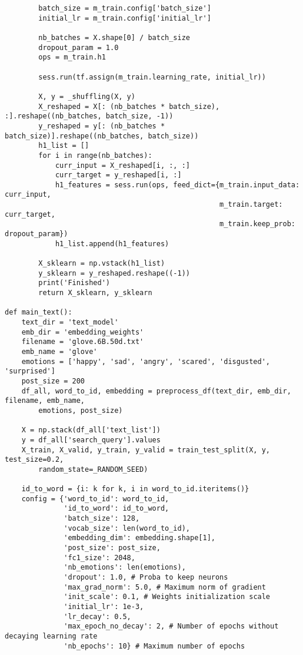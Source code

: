 \begin{lstlisting}
        batch_size = m_train.config['batch_size']
        initial_lr = m_train.config['initial_lr']
        
        nb_batches = X.shape[0] / batch_size
        dropout_param = 1.0
        ops = m_train.h1
        
        sess.run(tf.assign(m_train.learning_rate, initial_lr))

        X, y = _shuffling(X, y)
        X_reshaped = X[: (nb_batches * batch_size), :].reshape((nb_batches, batch_size, -1))
        y_reshaped = y[: (nb_batches * batch_size)].reshape((nb_batches, batch_size))
        h1_list = []
        for i in range(nb_batches):
            curr_input = X_reshaped[i, :, :]
            curr_target = y_reshaped[i, :]
            h1_features = sess.run(ops, feed_dict={m_train.input_data: curr_input, 
                                                   m_train.target: curr_target,
                                                   m_train.keep_prob: dropout_param})
            h1_list.append(h1_features)

        X_sklearn = np.vstack(h1_list)
        y_sklearn = y_reshaped.reshape((-1))
        print('Finished')
        return X_sklearn, y_sklearn

def main_text():
    text_dir = 'text_model'
    emb_dir = 'embedding_weights'
    filename = 'glove.6B.50d.txt'
    emb_name = 'glove'
    emotions = ['happy', 'sad', 'angry', 'scared', 'disgusted', 'surprised']
    post_size = 200
    df_all, word_to_id, embedding = preprocess_df(text_dir, emb_dir, filename, emb_name, 
        emotions, post_size)

    X = np.stack(df_all['text_list'])
    y = df_all['search_query'].values
    X_train, X_valid, y_train, y_valid = train_test_split(X, y, test_size=0.2, 
        random_state=_RANDOM_SEED)

    id_to_word = {i: k for k, i in word_to_id.iteritems()}
    config = {'word_to_id': word_to_id,
              'id_to_word': id_to_word,
              'batch_size': 128,
              'vocab_size': len(word_to_id),
              'embedding_dim': embedding.shape[1],
              'post_size': post_size,
              'fc1_size': 2048,
              'nb_emotions': len(emotions),
              'dropout': 1.0, # Proba to keep neurons
              'max_grad_norm': 5.0, # Maximum norm of gradient
              'init_scale': 0.1, # Weights initialization scale
              'initial_lr': 1e-3,
              'lr_decay': 0.5,
              'max_epoch_no_decay': 2, # Number of epochs without decaying learning rate
              'nb_epochs': 10} # Maximum number of epochs
    

\end{lstlisting}
